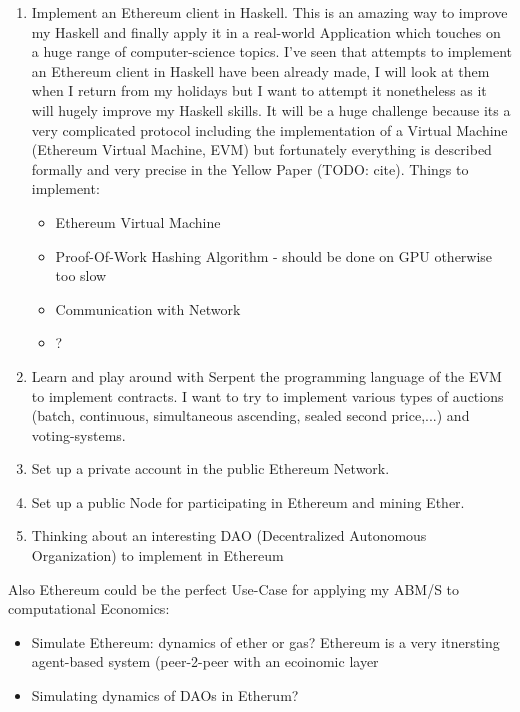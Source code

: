 \begin{enumerate}
\item Implement an Ethereum client in Haskell. This is an amazing way to improve my Haskell and finally apply it in a real-world Application which touches on a huge range of computer-science topics. I've seen that attempts to implement an Ethereum client in Haskell have been already made, I will look at them when I return from my holidays but I want to attempt it nonetheless as it will hugely improve my Haskell skills. It will be a huge challenge because its a very complicated protocol including the implementation of a Virtual Machine (Ethereum Virtual Machine, EVM) but fortunately everything is described formally and very precise in the Yellow Paper (TODO: cite). Things to implement:

	\begin{itemize}
	\item Ethereum Virtual Machine
	\item Proof-Of-Work Hashing Algorithm - should be done on GPU otherwise too slow
	\item Communication with Network
	\item ?
	\end{itemize}
 
\item Learn and play around with Serpent the programming language of the EVM to implement contracts. I want to try to implement various types of auctions (batch, continuous, simultaneous ascending, sealed second price,...) and voting-systems.

\item Set up a private account in the public Ethereum Network.
\item Set up a public Node for participating in Ethereum and mining Ether.
\item Thinking about an interesting DAO (Decentralized Autonomous Organization) to implement in Ethereum
\end{enumerate}

Also Ethereum could be the perfect Use-Case for applying my ABM/S to computational Economics: 

\begin{itemize}
\item Simulate Ethereum: dynamics of ether or gas? Ethereum is a very itnersting agent-based system (peer-2-peer with an ecoinomic layer
\item Simulating dynamics of DAOs in Etherum?
\end{itemize}

